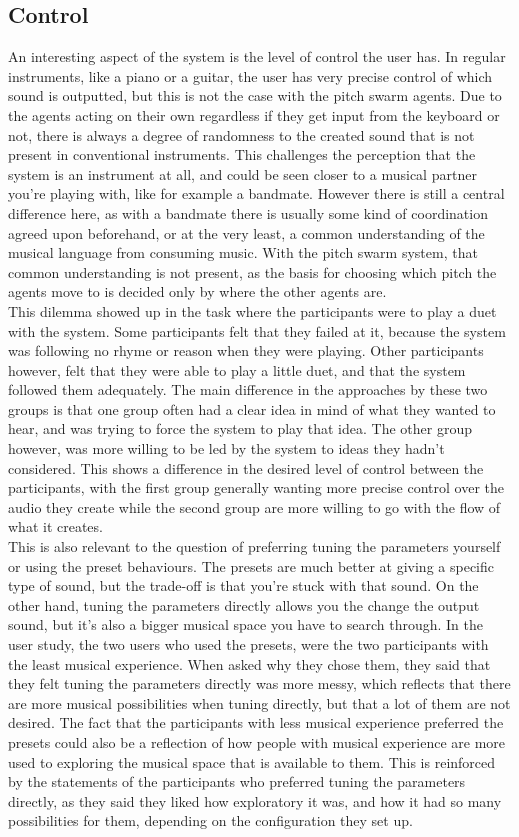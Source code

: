 \documentclass[a4paper,english]{report}
\begin{document}
	\subsection{Control}
	An interesting aspect of the system is the level of control the user has. In regular instruments, like a piano or a guitar, the user has very precise control of which sound is outputted, but this is not the case with the pitch swarm agents. Due to the agents acting on their own regardless if they get input from the keyboard or not, there is always a degree of randomness to the created sound that is not present in conventional instruments. This challenges the perception that the system is an instrument at all, and could be seen closer to a musical partner you're playing with, like for example a bandmate. However there is still a central difference here, as with a bandmate there is usually some kind of coordination agreed upon beforehand, or at the very least, a common understanding of the musical language from consuming music. With the pitch swarm system, that common understanding is not present, as the basis for choosing which pitch the agents move to is decided only by where the other agents are.\\
	This dilemma showed up in the task where the participants were to play a duet with the system. Some participants felt that they failed at it, because the system was following no rhyme or reason when they were playing. Other participants however, felt that they were able to play a little duet, and that the system followed them adequately. The main difference in the approaches by these two groups is that one group often had a clear idea in mind of what they wanted to hear, and was trying to force the system to play that idea. The other group however, was more willing to be led by the system to ideas they hadn't considered. This shows a difference in the desired level of control between the participants, with the first group generally wanting more precise control over the audio they create while the second group are more willing to go with the flow of what it creates.\\
	This is also relevant to the question of preferring tuning the parameters yourself or using the preset behaviours. The presets are much better at giving a specific type of sound, but the trade-off is that you're stuck with that sound. On the other hand, tuning the parameters directly allows you the change the output sound, but it's also a bigger musical space you have to search through. In the user study, the two users who used the presets, were the two participants with the least musical experience. When asked why they chose them, they said that they felt tuning the parameters directly was more messy, which reflects that there are more musical possibilities when tuning directly, but that a lot of them are not desired. The fact that the participants with less musical experience preferred the presets could also be a reflection of how people with musical experience are more used to exploring the musical space that is available to them. This is reinforced by the statements of the participants who preferred tuning the parameters directly, as they said they liked how exploratory it was, and how it had so many possibilities for them, depending on the configuration they set up.\\
\end{document}
